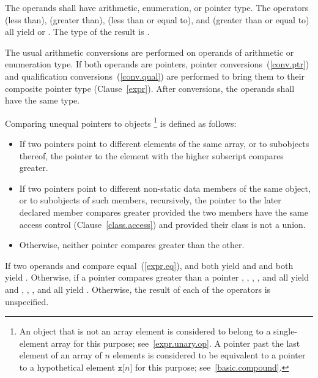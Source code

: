 The operands shall have arithmetic, enumeration, or pointer type. The
operators \tcode{<} (less than), \tcode{>} (greater than), \tcode{<=}
(less than or equal to), and \tcode{>=} (greater than or equal to) all
yield  or . The type of the result is
.

\pnum
The usual arithmetic conversions are performed on operands of arithmetic
or enumeration type. If both operands are pointers, pointer
conversions~(\ref{conv.ptr}) and qualification conversions~(\ref{conv.qual})
are performed to bring
them to their composite pointer type (Clause~\ref{expr}).
After conversions, the operands shall have the same type.

\pnum
Comparing unequal pointers to objects%
\footnote{An object that is not an array element is considered to belong to a
single-element array for this purpose; see~\ref{expr.unary.op}.
A pointer past the last element of an array  of $n$ elements
is considered to be equivalent to a pointer to a hypothetical element
$\mathtt{x[}n\mathtt{]}$ for this purpose; see~\ref{basic.compound}.}
is defined as follows:

\begin{itemize}
\item If two pointers point to different elements of the same array, or to
subobjects thereof, the pointer to the element with the higher subscript
compares greater.

\item If two pointers point to different non-static data members of the same
object, or to subobjects of such members, recursively,
the pointer to the later declared member compares greater provided the
two members
have the same access control (Clause~\ref{class.access})
and provided their class is not a union.

\item Otherwise, neither pointer compares greater than the other.

\end{itemize}

\pnum
If two operands  and  compare equal~(\ref{expr.eq}),
 and  both yield  and  and
 both yield . Otherwise, if a pointer 
compares greater than a pointer , , ,
, and  all yield  and ,
, , and  all yield .
Otherwise, the result of each of the operators is unspecified.


